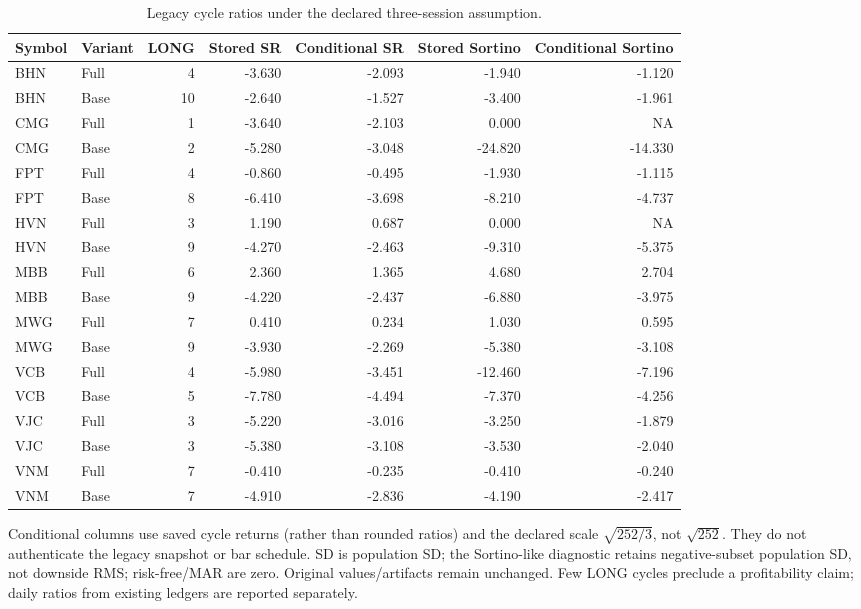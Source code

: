 \begin{table}[htbp]
\centering\small
\caption{Legacy cycle ratios under the declared three-session assumption.}
\label{tab:d206_cycle_risk}
\setlength{\tabcolsep}{3.5pt}
\begin{tabular}{llrrrrr}
\hline
Symbol & Variant & LONG & Stored SR & Conditional SR & Stored Sortino & Conditional Sortino \\
\hline
BHN & Full & 4 & -3.630 & -2.093 & -1.940 & -1.120 \\
BHN & Base & 10 & -2.640 & -1.527 & -3.400 & -1.961 \\
CMG & Full & 1 & -3.640 & -2.103 & 0.000 & NA \\
CMG & Base & 2 & -5.280 & -3.048 & -24.820 & -14.330 \\
FPT & Full & 4 & -0.860 & -0.495 & -1.930 & -1.115 \\
FPT & Base & 8 & -6.410 & -3.698 & -8.210 & -4.737 \\
HVN & Full & 3 & 1.190 & 0.687 & 0.000 & NA \\
HVN & Base & 9 & -4.270 & -2.463 & -9.310 & -5.375 \\
MBB & Full & 6 & 2.360 & 1.365 & 4.680 & 2.704 \\
MBB & Base & 9 & -4.220 & -2.437 & -6.880 & -3.975 \\
MWG & Full & 7 & 0.410 & 0.234 & 1.030 & 0.595 \\
MWG & Base & 9 & -3.930 & -2.269 & -5.380 & -3.108 \\
VCB & Full & 4 & -5.980 & -3.451 & -12.460 & -7.196 \\
VCB & Base & 5 & -7.780 & -4.494 & -7.370 & -4.256 \\
VJC & Full & 3 & -5.220 & -3.016 & -3.250 & -1.879 \\
VJC & Base & 3 & -5.380 & -3.108 & -3.530 & -2.040 \\
VNM & Full & 7 & -0.410 & -0.235 & -0.410 & -0.240 \\
VNM & Base & 7 & -4.910 & -2.836 & -4.190 & -2.417 \\
\hline
\end{tabular}
\par\smallskip\footnotesize Conditional columns use saved cycle returns (rather than rounded ratios) and the declared scale $\sqrt{252/3}$, not $\sqrt{252}$. They do not authenticate the legacy snapshot or bar schedule. SD is population SD; the Sortino-like diagnostic retains negative-subset population SD, not downside RMS; risk-free/MAR are zero. Original values/artifacts remain unchanged. Few LONG cycles preclude a profitability claim; daily ratios from existing ledgers are reported separately.
\end{table}
